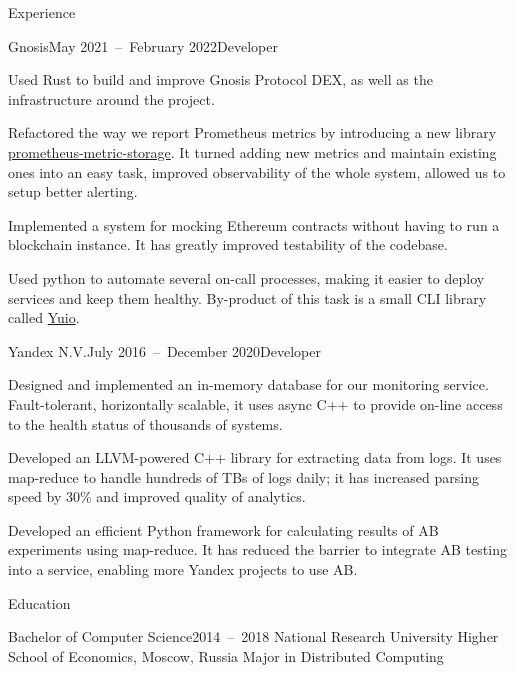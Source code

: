 \documentclass{resume}
\begin{document}
    \begin{rSection}{Experience}
        \begin{rSubsection}{Gnosis}{May 2021~--~February 2022}{Developer}{}
            \item
                Used Rust to build and improve Gnosis Protocol DEX,
                as well as the infrastructure around the project.
            \item
                Refactored the way we report Prometheus metrics
                by introducing a new library
                \href{https://github.com/taminomara/prometheus-metric-storage}{prometheus-metric-storage}.
                It turned adding new metrics
                and maintain existing ones into an easy task,
                improved observability of the whole system,
                allowed us to setup better alerting.
            \item
                Implemented a system for mocking Ethereum contracts
                without having to run a blockchain instance.
                It has greatly improved testability of the codebase.
            \item
                Used python to automate several on-call processes,
                making it easier to deploy services and keep them healthy.
                By-product of this task is a small CLI library called
                \href{https://github.com/taminomara/yuio}{Yuio}.
        \end{rSubsection}

        \begin{rSubsection}{Yandex N.V.}{July 2016~--~December 2020}{Developer}{}
            \item
                Designed and implemented an in-memory database
                for our monitoring service.
                Fault-tolerant, horizontally scalable,
                it uses async C++ to provide on-line access
                to the health status of thousands of systems.
            \item
                Developed an LLVM-powered C++ library
                for extracting data from logs.
                It uses map-reduce to handle hundreds of TBs of logs daily;
                it has increased parsing speed
                by 30\% and improved quality of analytics.
            \item
                Developed an efficient Python framework
                for calculating results of AB experiments using map-reduce.
                It has reduced the barrier
                to integrate AB testing into a service,
                enabling more Yandex projects to use AB\@.
        \end{rSubsection}
    \end{rSection}

    \begin{rSection}{Education}
        \begin{rSubsection}{Bachelor of Computer Science}{2014~--~2018}
        {National Research University Higher School of Economics, Moscow, Russia}{}
            Major in Distributed Computing
        \end{rSubsection}
    \end{rSection}
\end{document}
